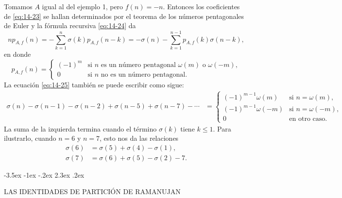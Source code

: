 \documentclass[12pt,a4paper]{book}
\makeatletter
\renewcommand\section{\@startsection{section}{1}{\z@}%
  {-3.5ex \@plus -1ex \@minus -.2ex}%
  {2.3ex \@plus .2ex}%
  {\normalfont\Large\bfseries\raggedright}}
\makeatother
\begin{document}
    \begin{ejemplo}
        Tomamos $A$ igual al del ejemplo 1, pero $f(n)=-n$. Entonces los coeficientes de
        \eqref{eq:14-23} se hallan determinados por el teorema de los números pentagonales de
        Euler y la fórmula recursiva \eqref{eq:14-24} da
        \begin{equation}\label{eq:14-25}
            np_{A,f}(n)=-\sum_{k=1}^{n}\sigma(k)p_{A,f}(n-k)=-\sigma(n)-\sum_{k=1}^{n-1}p_{A,f}(k)\sigma(n-k),
        \end{equation}
        en donde
        \begin{equation*}
            p_{A,f}(n)=
            \begin{cases}
                (-1)^{m}&\text{si }n\text{ es un número pentagonal }\omega(m)\text{ o }\omega(-m),\\
                0&\text{si }n\text{ no es un número pentagonal.}
            \end{cases}
        \end{equation*}
        La ecuación \eqref{eq:14-25} también se puede escribir como sigue:
        \begin{align*}
            \sigma(n)-\sigma(n-1)-\sigma(n-2)+\sigma(n-5)+\sigma(n-7)-\cdots
            &=
            \begin{cases}
                (-1)^{m-1}\omega(m)&\text{si }n=\omega(m),\\
                (-1)^{m-1}\omega(-m)&\text{si }n=\omega(-m),\\
                0&\text{en otro caso.}
            \end{cases}
        \end{align*}
        La suma de la izquierda termina cuando el término $\sigma(k)$ tiene $k\leq1$. Para
        ilustrarlo, cuando $n=6$ y $n=7$, esto nos da las relaciones
        \begin{align*}
            \sigma(6)&=\sigma(5)+\sigma(4)-\sigma(1),\\
            \sigma(7)&=\sigma(6)+\sigma(5)-\sigma(2)-7.
        \end{align*}
    \end{ejemplo}

    \section{LAS IDENTIDADES DE PARTICIÓN DE RAMANUJAN}\label{sim:pn}
\end{document}
